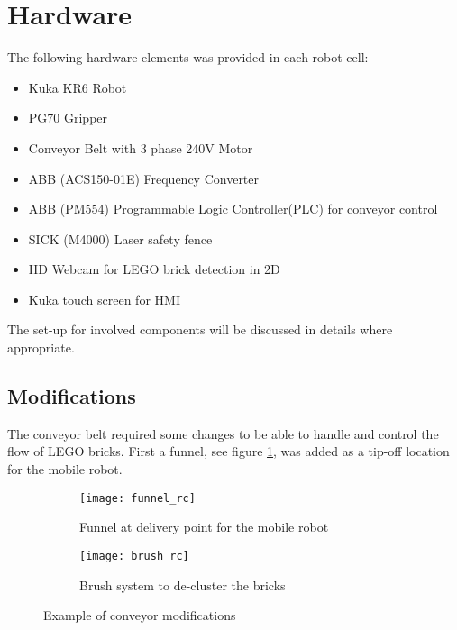 \section{Hardware}
\label{sec:rc_hardware}
The following hardware elements was provided in each robot cell:

\begin{itemize}
	\item Kuka KR6 Robot
	\item PG70 Gripper
	\item Conveyor Belt with 3 phase 240V Motor
	\item ABB (ACS150-01E) Frequency Converter
	\item ABB (PM554) Programmable Logic Controller(PLC) for conveyor control
	\item SICK (M4000) Laser safety fence
	\item HD Webcam for LEGO brick detection in 2D
	\item Kuka touch screen for HMI
\end{itemize}

The set-up for involved components will be discussed in details where appropriate. 

\subsection{Modifications}
The conveyor belt required some changes to be able to handle and control the flow of LEGO bricks. First a funnel, see figure \ref{fig:funnel}, was added as a tip-off location for the mobile robot.

  	\begin{figure}[H]
        \centering
        \begin{subfigure}{0.48\textwidth}
			\texttt{[image: funnel\_rc]}
			\caption{Funnel at delivery point for the mobile robot}
			\label{fig:funnel}
        \end{subfigure}
        \hspace{10pt}
        \begin{subfigure}{0.48\textwidth}
			\texttt{[image: brush\_rc]}
			\caption{Brush system to de-cluster the bricks}
			\label{fig:brush}
    \end{subfigure}
    \caption{Example of conveyor modifications}
    \end{figure}

